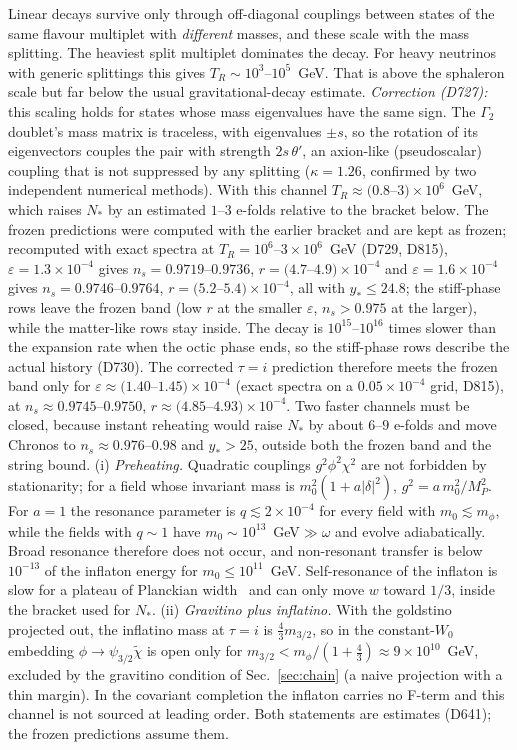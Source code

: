\documentclass[aps,prd,twocolumn,superscriptaddress,nofootinbib,floatfix]{revtex4-2}
\begin{document}
Linear decays survive only through off-diagonal couplings between states of the same flavour multiplet with \emph{different} masses, and these scale with the mass splitting. The heaviest split multiplet dominates the decay. For heavy neutrinos with generic splittings this gives $T_R \sim 10^3$--$10^5$~GeV. That is above the sphaleron scale but far below the usual gravitational-decay estimate. \emph{Correction (D727):} this scaling holds for states whose mass eigenvalues have the same sign. The $\Gamma_2$ doublet's mass matrix is traceless, with eigenvalues $\pm s$, so the rotation of its eigenvectors couples the pair with strength $2s\,\theta'$, an axion-like (pseudoscalar) coupling that is not suppressed by any splitting ($\kappa=1.26$, confirmed by two independent numerical methods). With this channel $T_R\approx(0.8$--$3)\times10^6$~GeV, which raises $N_*$ by an estimated $1$--$3$ e-folds relative to the bracket below. The frozen predictions were computed with the earlier bracket and are kept as frozen; recomputed with exact spectra at $T_R=10^6$--$3\times10^6$~GeV (D729, D815), $\varepsilon=1.3\times10^{-4}$ gives $n_s=0.9719$--$0.9736$, $r=(4.7$--$4.9)\times10^{-4}$ and $\varepsilon=1.6\times10^{-4}$ gives $n_s=0.9746$--$0.9764$, $r=(5.2$--$5.4)\times10^{-4}$, all with $y_*\le24.8$; the stiff-phase rows leave the frozen band (low $r$ at the smaller $\varepsilon$, $n_s>0.975$ at the larger), while the matter-like rows stay inside. The decay is $10^{15}$--$10^{16}$ times slower than the expansion rate when the octic phase ends, so the stiff-phase rows describe the actual history (D730). The corrected $\tau=i$ prediction therefore meets the frozen band only for $\varepsilon\approx(1.40$--$1.45)\times10^{-4}$ (exact spectra on a $0.05\times10^{-4}$ grid, D815), at $n_s\approx0.9745$--$0.9750$, $r\approx(4.85$--$4.93)\times10^{-4}$. Two faster channels must be closed, because instant reheating would raise $N_*$ by about $6$--$9$ e-folds and move Chronos to $n_s\approx0.976$--$0.98$ and $y_*>25$, outside both the frozen band and the string bound. (i) \emph{Preheating.} Quadratic couplings $g^2\phi^2\chi^2$ are not forbidden by stationarity; for a field whose invariant mass is $m_0^2(1+a|\delta|^2)$, $g^2=a\,m_0^2/M_P^2$. For $a=1$ the resonance parameter is $q\lesssim2\times10^{-4}$ for every field with $m_0\lesssim m_\phi$, while the fields with $q\sim1$ have $m_0\sim10^{13}$~GeV$\gg\omega$ and evolve adiabatically. Broad resonance therefore does not occur, and non-resonant transfer is below $10^{-13}$ of the inflaton energy for $m_0\le10^{11}$~GeV. Self-resonance of the inflaton is slow for a plateau of Planckian width~\cite{arXiv_1710_06851} and can only move $w$ toward $1/3$, inside the bracket used for $N_*$. (ii) \emph{Gravitino plus inflatino.} With the goldstino projected out, the inflatino mass at $\tau=i$ is $\tfrac43m_{3/2}$, so in the constant-$W_0$ embedding $\phi\to\psi_{3/2}\tilde\chi$ is open only for $m_{3/2}<m_\phi/(1+\tfrac43)\approx9\times10^{10}$~GeV, excluded by the gravitino condition of Sec.~\ref{sec:chain} (a naive projection with a thin margin). In the covariant completion the inflaton carries no F-term and this channel is not sourced at leading order. Both statements are estimates (D641); the frozen predictions assume them.
\end{document}
